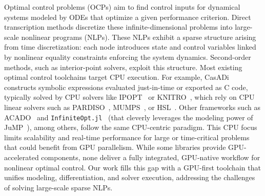 Optimal control problems (OCPs) aim to find control inputs for dynamical systems modeled by ODEs that optimize a given performance criterion.
Direct transcription methods discretize these infinite-dimensional problems into large-scale nonlinear programs (NLPs).
These NLPs exhibit a sparse structure arising from time discretization: each node introduces state and control variables linked by nonlinear equality constraints enforcing the system dynamics.
Second-order methods, such as interior-point solvers, exploit this structure. %
%
Most existing optimal control toolchains target CPU execution.
For example, CasADi~\cite{Andersson2019} constructs symbolic expressions evaluated just-in-time or exported as C code, typically solved by CPU solvers like IPOPT~\cite{wachter2006implementation} or KNITRO~\cite{byrd2006k}, which rely on CPU linear solvers such as PARDISO~\cite{schenk2004solving}, MUMPS~\cite{amestoy2000mumps}, or HSL~\cite{fowkes2024libhsl}.
%
Other frameworks such as ACADO~\cite{houska2011acado} and 
\texttt{InfiniteOpt.jl}~\cite{pulsipher2022unifying} (that cleverly leverages 
the modeling power of JuMP~\cite{dunning2017jump}), among others,
follow the same CPU-centric paradigm.
%
This CPU focus limits scalability and real-time performance for large or time-critical problems that could benefit from GPU parallelism.
While some libraries provide GPU-accelerated components, none deliver a fully integrated, GPU-native workflow for nonlinear optimal control.
%
Our work fills this gap with a GPU-first toolchain that unifies modeling, differentiation, and solver execution, addressing the challenges of solving large-scale sparse NLPs.

